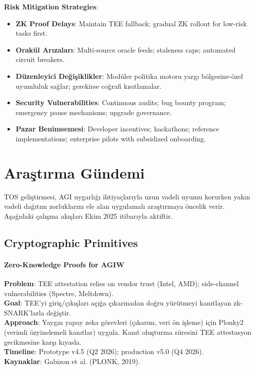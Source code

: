 \documentclass[11pt]{article}
\begin{document}
\begin{itemize}[noitemsep]
\begin{itemize}[noitemsep]
\begin{itemize}[noitemsep]
\begin{itemize}[noitemsep]
\begin{itemize}[noitemsep]
\begin{itemize}[noitemsep]
\begin{itemize}[noitemsep]
\begin{enumerate}[noitemsep]
\begin{itemize}[noitemsep]
\textbf{Risk Mitigation Strategies}:
\begin{itemize}[noitemsep]
  \item \textbf{ZK Proof Delays}: Maintain TEE fallback; gradual ZK rollout for low-risk tasks first.
  \item \textbf{Orakül Arızaları}: Multi-source oracle feeds; staleness caps; automated circuit breakers.
  \item \textbf{Düzenleyici Değişiklikler}: Modüler politika motoru yargı bölgesine-özel uyumluluk sağlar; gerekirse coğrafi kısıtlamalar.
  \item \textbf{Security Vulnerabilities}: Continuous audits; bug bounty program; emergency pause mechanisms; upgrade governance.
  \item \textbf{Pazar Benimsemesi}: Developer incentives; hackathons; reference implementations; enterprise pilots with subsidized onboarding.
\end{itemize}

\section{Araştırma Gündemi}
\label{sec:research}

TOS geliştirmesi, AGI uygarlığı ihtiyaçlarıyla uzun vadeli uyumu korurken yakın vadeli dağıtım zorluklarını ele alan uygulamalı araştırmaya öncelik verir. Aşağıdaki çalışma akışları Ekim 2025 itibarıyla aktiftir.

\subsection{Cryptographic Primitives}

\paragraph{Zero-Knowledge Proofs for AGIW}
\textbf{Problem}: TEE attestation relies on vendor trust (Intel, AMD); side-channel vulnerabilities (Spectre, Meltdown).\\
\textbf{Goal}: TEE'yi giriş/çıkışları açığa çıkarmadan doğru yürütmeyi kanıtlayan zk-SNARK'larla değiştir.\\
\textbf{Approach}: Yaygın yapay zeka görevleri (çıkarım, veri ön işleme) için Plonky2 (verimli özyinelemeli kanıtlar) uygula. Kanıt oluşturma süresini TEE attestasyon gecikmesine karşı kıyasla.\\
\textbf{Timeline}: Prototype v4.5 (Q2 2026); production v5.0 (Q4 2026).\\
\textbf{Kaynaklar}: Gabizon et al. (PLONK, 2019).


\end{itemize}
\end{enumerate}
\end{itemize}
\end{itemize}
\end{itemize}
\end{itemize}
\end{itemize}
\end{itemize}
\end{itemize}
\end{document}
